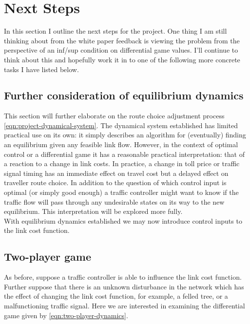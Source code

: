 \section{Next Steps}

In this section I outline the next steps for the project.
One thing I am still thinking about from the white paper feedback is viewing the problem from the perspective of an inf/sup condition on differential game values.
I'll continue to think about this and hopefully work it in to one of the following more concrete tasks I have listed below.

\subsection{Further consideration of equilibrium dynamics}

This section will further elaborate on the route choice adjustment process \eqref{eqn:project-dynamical-system}.
The dynamical system established has limited practical use on its own: it simply describes an algorithm for (eventually) finding an equilibrium given any feasible link flow.
However, in the context of optimal control or a differential game it has a reasonable practical interpretation: that of a reaction to a change in link costs. 
In practice, a change in toll price or traffic signal timing has an immediate effect on travel cost but a delayed effect on traveller route choice.
In addition to the question of which control input is optimal (or simply good enough) a traffic controller might want to know if the traffic flow will pass through any undesirable states on its way to the new equilibrium.
This interpretation will be explored more fully.\\

With equilibrium dynamics established we may now introduce control inputs to the link cost function.


\subsection{Two-player game}

As before, suppose a traffic controller is able to influence the link cost function.
Further suppose that there is an unknown disturbance in the network which has the effect of changing the link cost function, for example, a felled tree, or a malfunctioning traffic signal.
Here we are interested in examining the differential game given by \eqref{eqn:two-player-dynamics}.

